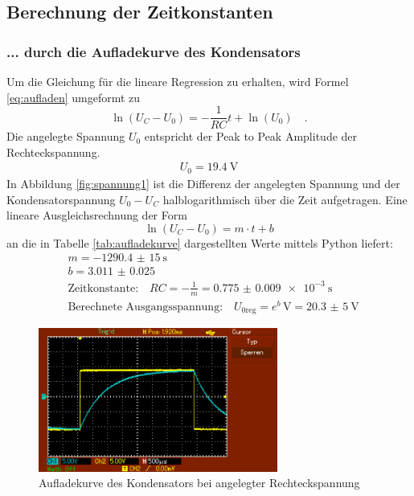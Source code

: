 
\subsection{Berechnung der Zeitkonstanten}
\subsubsection{... durch die Aufladekurve des Kondensators}
Um die Gleichung für die lineare Regression zu erhalten, wird Formel \eqref{eq:aufladen} umgeformt zu
\begin{equation}
\ln(U_C - U_0) = -\frac{1}{RC} t + \ln(U_0) \quad .
\end{equation}
Die angelegte Spannung $U_0$ entspricht der Peak to Peak Amplitude der Rechteckspannung.
\begin{align*}
	U_0 = \SI{19.4}{\volt}
\end{align*}
In Abbildung \ref{fig:spannung1} ist die Differenz der angelegten Spannung und der Kondensatorspannung $U_0 - U_C$ halblogarithmisch über die Zeit aufgetragen. Eine lineare Ausgleichsrechnung der Form
\begin{equation}
\ln(U_C - U_0) = m \cdot t + b
\end{equation} an die in Tabelle \ref{tab:aufladekurve} dargestellten Werte mittels Python liefert:
\begin{align}
	&m = \SI{-1290.4(150)}{\second} \\
	&b = \num{3.011(25)} \\
	&\text{Zeitkonstante:} \quad RC = - \frac{1}{m} = \SI{0.775(9)e-3}{\second} \\
	&\text{Berechnete Ausgangsspannung:} \quad U_{0\text{reg}} = e ^b \, \si{\volt} = \SI{20,3(5)}{\volt}
\end{align}


	
	
	
	
	

\begin{figure}[h!]
	\centering
	\includegraphics[width=0.7\textwidth]{aufladekurve.png}
	\caption{Aufladekurve des Kondensators bei angelegter Rechteckspannung}
	\label{fig:aufladekurve}
\end{figure} 

